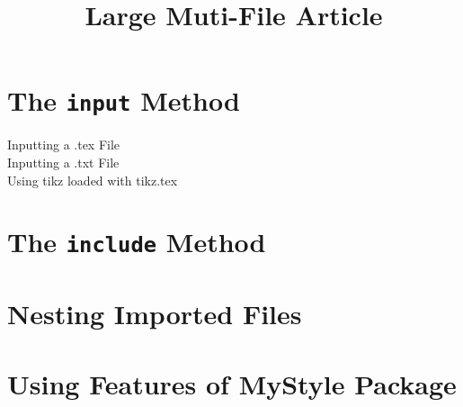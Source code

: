 \documentclass{article}
\title{\Large\bf Large Muti-File Article}
\date{}
\begin{document}
	\maketitle
	
	\section{The \texttt{input} Method}
	\begin{description}
		\item[Inputting a .tex File]
			
		\item[Inputting a .txt File]
			
		\item[Using tikz loaded with tikz.tex]
	\end{description}
	
	\section{The \texttt{include} Method}
	
	
	
	\pagebreak
	
	\section{Nesting Imported Files}
	
	
	
	\pagebreak
	
	\section{Using Features of MyStyle Package}
	\RedTeX{\LaTeX}
	
\end{document}
